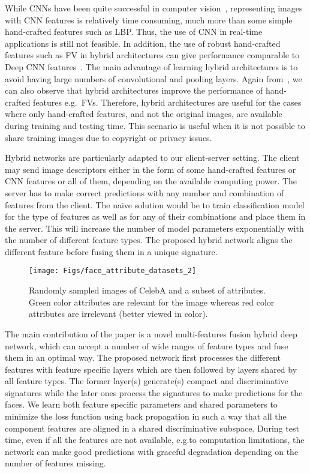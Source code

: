 \documentclass{sig-alternate-05-2015}
\begin{document}
While CNNs have been quite successful in  computer vision~\cite{krizhevsky2012imagenet}, representing images with CNN features is relatively time consuming, much more than some simple hand-crafted features such as LBP. Thus, the use of CNN in real-time applications is still not feasible. In addition, the use of robust hand-crafted features such as FV in hybrid architectures can give performance comparable to Deep CNN features~\cite{perronnin2015fisher}. The main advantage of learning hybrid architectures is to avoid having large numbers of convolutional and pooling layers. Again from~\cite{perronnin2015fisher}, we can also observe that hybrid architectures improve the performance of hand-crafted features e.g.\ FVs. Therefore, hybrid architectures are useful for the cases where only hand-crafted features, and not the original images, are available during training and testing time. This scenario is useful when it is not possible to share training images due to copyright or privacy issues. 

Hybrid networks are particularly adapted to our client-server setting. The client may send image descriptors either in the form of some hand-crafted features or CNN features or all of them, depending on the available computing power. The server has to make correct predictions with any number and combination of features from the client. The naive solution would be to train classification model for the type of  features as well as for any of their combinations and place them in the server. This will increase the number of model parameters exponentially with the number of different feature types. The proposed hybrid network aligns the different feature before fusing them in a unique signature.

\begin{figure*}[t]
\centering
\texttt{[image: Figs/face\_attribute\_datasets\_2]} 
\vspace{-0.4em}
\caption{
Randomly sampled images of CelebA and a subset of attributes. Green color attributes are relevant for the image whereas red color attributes are irrelevant (better viewed in color).
}
\vspace{-1em}
\label{fig:illus}
\end{figure*}

The main contribution of the paper is a novel multi-features fusion hybrid deep network, which can accept a number of wide ranges of feature types and fuse them in 
an optimal way. The proposed network first processes 
the different features with feature specific layers which are then followed by layers shared by all feature types. The former layer(s) generate(s) compact and discriminative 
signatures while the later ones process the signatures to make predictions for the faces. 
We learn both feature specific parameters and shared parameters to minimize the loss function using back propagation in such a way that all the component features 
are aligned in a shared discriminative subspace.
During test time, even if all the features are not available, e.g.\due to computation limitations, the network can make good predictions with graceful degradation depending 
on the number of features missing. 
\end{document}
